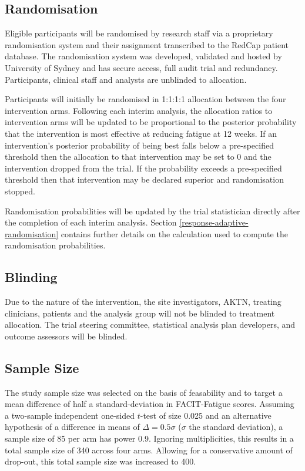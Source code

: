 \documentclass[
]{article}
\begin{document}
\hypertarget{randomisation}{%
  \subsection{Randomisation}\label{randomisation}}

Eligible participants will be randomised by research staff via a proprietary randomisation system and their assignment transcribed to the RedCap patient database.
The randomisation system was developed, validated and hosted by University of Sydney and has secure access, full audit trial and redundancy.
Participants, clinical staff and analysts are unblinded to allocation.

Participants will initially be randomised in 1:1:1:1 allocation between the four intervention arms.
Following each interim analysis, the allocation ratios to intervention arms will be updated to be proportional to the posterior probability that the intervention is most effective at reducing fatigue at 12 weeks.
If an intervention's posterior probability of being best falls below a pre-specified threshold then the allocation to that intervention may be set to 0 and the intervention dropped from the trial.
If the probability exceeds a pre-specified threshold then that intervention may be declared superior and randomisation stopped.

Randomisation probabilities will be updated by the trial statistician directly after the completion of each interim analysis.
Section \ref{response-adaptive-randomisation} contains further details on the calculation used to compute the randomisation probabilities.

\hypertarget{blinding}{%
  \subsection{Blinding}\label{blinding}}

  Due to the nature of the intervention, the site investigators, AKTN, treating clinicians, patients and the analysis group will not be blinded to treatment allocation. 
  The trial steering committee, statistical analysis plan developers, and outcome assessors will be blinded. 

\hypertarget{sample-size}{%
  \subsection{Sample Size}\label{sample-size}}

The study sample size was selected on the basis of feasability and to target a mean difference of half a standard-deviation in FACIT-Fatigue scores.
Assuming a two-sample independent one-sided $t$-test of size 0.025 and an alternative hypothesis of a difference in means of $\Delta=0.5\sigma$ ($\sigma$ the standard deviation), a sample size of 85 per arm has power 0.9.
Ignoring multiplicities, this results in a total sample size of 340 across four arms.
Allowing for a conservative amount of drop-out, this total sample size was increased to 400.
\end{document}

